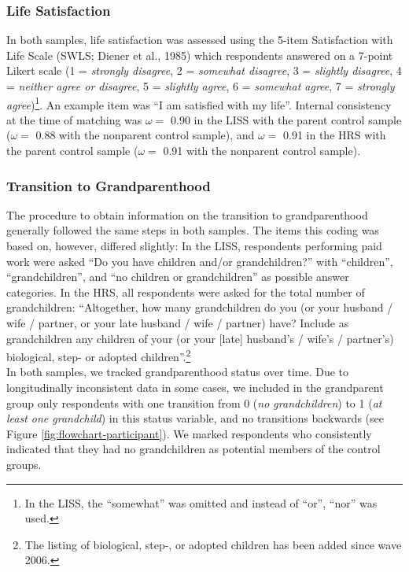 \documentclass[
  english,
  man, noextraspace]{apa7}
\begin{document}
\hypertarget{life-satisfaction}{%
\subsubsection{Life Satisfaction}\label{life-satisfaction}}

In both samples, life satisfaction was assessed using the 5-item Satisfaction with Life Scale (SWLS; Diener et al., 1985) which respondents answered on a 7-point Likert scale (1 = \emph{strongly disagree}, 2 = \emph{somewhat disagree}, 3 = \emph{slightly disagree}, 4 = \emph{neither agree or disagree}, 5 = \emph{slightly agree}, 6 = \emph{somewhat agree}, 7 = \emph{strongly agree})\footnote{In the LISS, the \enquote{somewhat} was omitted and instead of \enquote{or}, \enquote{nor} was used.}. An example item was \enquote{I am satisfied with my life}. Internal consistency at the time of matching was \(\omega =\) 0.90 in the LISS with the parent control sample (\(\omega =\) 0.88 with the nonparent control sample), and \(\omega =\) 0.91 in the HRS with the parent control sample (\(\omega =\) 0.91 with the nonparent control sample).

\hypertarget{transition-to-grandparenthood}{%
\subsubsection{Transition to Grandparenthood}\label{transition-to-grandparenthood}}

The procedure to obtain information on the transition to grandparenthood generally followed the same steps in both samples. The items this coding was based on, however, differed slightly: In the LISS, respondents performing paid work were asked \enquote{Do you have children and/or grandchildren?} with \enquote{children}, \enquote{grandchildren}, and \enquote{no children or grandchildren} as possible answer categories. In the HRS, all respondents were asked for the total number of grandchildren: \enquote{Altogether, how many grandchildren do you (or your husband / wife / partner, or your late husband / wife / partner) have? Include as grandchildren any children of your (or your {[}late{]} husband's / wife's / partner's) biological, step- or adopted children}.\footnote{The listing of biological, step-, or adopted children has been added since wave 2006.}\\
In both samples, we tracked grandparenthood status over time. Due to longitudinally inconsistent data in some cases, we included in the grandparent group only respondents with one transition from 0 (\emph{no grandchildren}) to 1 (\emph{at least one grandchild}) in this status variable, and no transitions backwards (see Figure \ref{fig:flowchart-participant}). We marked respondents who consistently indicated that they had no grandchildren as potential members of the control groups.
\end{document}
